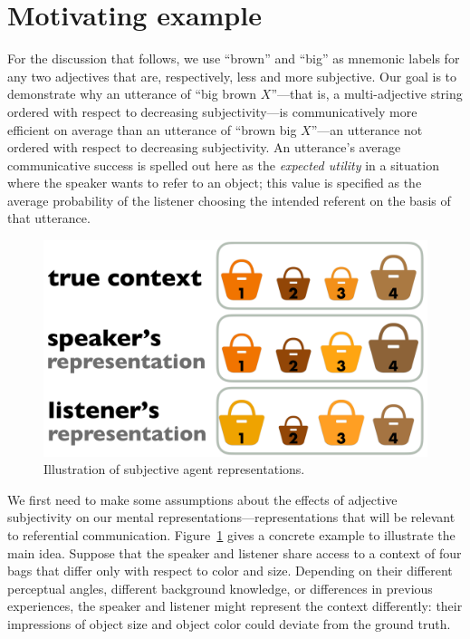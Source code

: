 \documentclass[10pt,a4paper]{article}
\begin{document}
\section{Motivating example}

For the discussion that follows, we use ``brown'' and ``big'' as mnemonic labels for any two adjectives that are, respectively, less and more subjective. Our goal is to demonstrate why an utterance of ``big brown $X$''---that is, a multi-adjective string ordered with respect to decreasing subjectivity---is communicatively more efficient on average than an utterance of ``brown big $X$''---an utterance not ordered with respect to decreasing subjectivity. An utterance's average communicative success is spelled out here as the \emph{expected utility} in a situation where the speaker wants to refer to an object; this value is specified as the average probability of the listener choosing the intended referent on the basis of that utterance.

\begin{figure}[t]
  \centering
 \includegraphics[width=.95\linewidth]{model_picture.pdf} 
 \vspace{-5pt}
  \caption{Illustration of subjective agent representations.}
  \label{fig:ModelIllustration}
\end{figure}

We first need to make some assumptions about the effects of adjective subjectivity on our mental representations---representations that will be relevant to referential communication. Figure~\ref{fig:ModelIllustration} gives a concrete example to illustrate the main idea. Suppose that the speaker and listener share access to a context of four bags that differ only with respect to color and size. Depending on their different perceptual angles, different background knowledge, or differences in previous experiences, the speaker and listener might represent the context differently: their impressions of object size and object color could deviate from the ground truth. 
\end{document}
